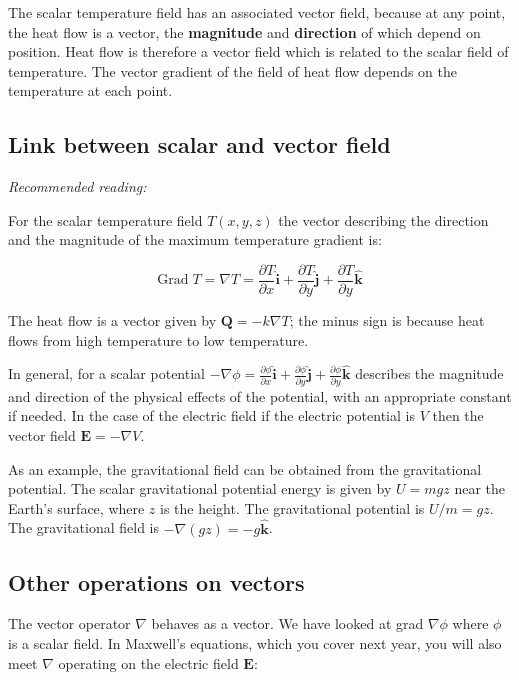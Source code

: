 \documentclass[
  letterpaper,
  DIV=11,
  numbers=noendperiod]{scrreprt}
\begin{document}
The scalar temperature field has an associated vector field, because at
any point, the heat flow is a vector, the \textbf{magnitude} and
\textbf{direction} of which depend on position. Heat flow is therefore a
vector field which is related to the scalar field of temperature. The
vector gradient of the field of heat flow depends on the temperature at
each point.

\subsection{Link between scalar and vector
field}\label{link-between-scalar-and-vector-field}

\emph{Recommended reading:}

For the scalar temperature field \(T(x,y,z)\) the vector describing the
direction and the magnitude of the maximum temperature gradient is:

\begin{equation}
 \text{Grad} \; T = \nabla T = \frac{\partial T} {\partial x} \hat{\mathbf{i}} + \frac{\partial T}{\partial y} \hat{\mathbf{j}} + \frac{\partial T}{\partial y} \hat{\mathbf{k}}
\end{equation}

The heat flow is a vector given by \(\mathbf{Q} = -k \nabla T\); the
minus sign is because heat flows from high temperature to low
temperature.

In general, for a scalar potential
\(-\nabla \phi = \frac{\partial \phi} {\partial x} \hat{\mathbf{i}} + \frac{\partial \phi}{\partial y} \hat{\mathbf{j}} + \frac{\partial \phi}{\partial y} \hat{\mathbf{k}}\)
describes the magnitude and direction of the physical effects of the
potential, with an appropriate constant if needed. In the case of the
electric field if the electric potential is \(V\) then the vector field
\(\mathbf{E} = -\nabla V\).

As an example, the gravitational field can be obtained from the
gravitational potential. The scalar gravitational potential energy is
given by \(U = mgz\) near the Earth's surface, where \(z\) is the
height. The gravitational potential is \(U/m = gz\). The gravitational
field is \(-\nabla(gz)=-g \hat{\mathbf{k}}\).

\subsection{Other operations on
vectors}\label{other-operations-on-vectors}

The vector operator \(\nabla\) behaves as a vector. We have looked at
grad \(\nabla\phi\) where \(\phi\) is a scalar field. In Maxwell's
equations, which you cover next year, you will also meet \(\nabla\)
operating on the electric field \(\mathbf{E}\):
\end{document}
